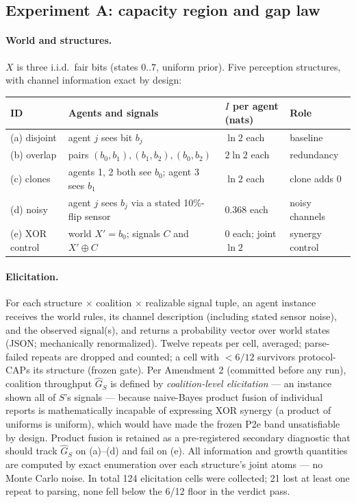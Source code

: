 \documentclass{article} %
\newcommand{\Ghat}{\hat{G}}
\begin{document}
\subsection{Experiment A: capacity region and gap law}
\label{sec:design-a}

\paragraph{World and structures.} $X$ is three i.i.d.\ fair bits (states $0..7$, uniform prior). Five perception structures, with channel information exact by design:

\begin{center}
\small
\begin{tabular}{@{}llll@{}}
\toprule
ID & Agents and signals & $I$ per agent (nats) & Role \\
\midrule
(a) disjoint & agent $j$ sees bit $b_j$ & $\ln 2$ each & baseline \\
(b) overlap & pairs $(b_0,b_1), (b_1,b_2), (b_0,b_2)$ & $2\ln 2$ each & redundancy \\
(c) clones & agents 1, 2 both see $b_0$; agent 3 sees $b_1$ & $\ln 2$ each & clone adds 0 \\
(d) noisy & agent $j$ sees $b_j$ via a stated 10\%-flip sensor & $0.368$ each & noisy channels \\
(e) XOR control & world $X' = b_0$; signals $C$ and $X' \oplus C$ & $0$ each; joint $\ln 2$ & synergy control \\
\bottomrule
\end{tabular}
\end{center}

\paragraph{Elicitation.} For each structure $\times$ coalition $\times$ realizable signal tuple, an agent instance receives the world rules, its channel description (including stated sensor noise), and the observed signal(s), and returns a probability vector over world states (JSON; mechanically renormalized). Twelve repeats per cell, averaged; parse-failed repeats are dropped and counted; a cell with $< 6/12$ survivors protocol-CAPs its structure (frozen gate). Per Amendment 2 (committed before any run), coalition throughput $\Ghat_S$ is defined by \emph{coalition-level elicitation} --- an instance shown all of $S$'s signals --- because naive-Bayes product fusion of individual reports is mathematically incapable of expressing XOR synergy (a product of uniforms is uniform), which would have made the frozen P2e band unsatisfiable by design. Product fusion is retained as a pre-registered secondary diagnostic that should track $\Ghat_S$ on (a)--(d) and fail on (e). All information and growth quantities are computed by exact enumeration over each structure's joint atoms --- no Monte Carlo noise. In total 124 elicitation cells were collected; 21 lost at least one repeat to parsing, none fell below the 6/12 floor in the verdict pass.
\end{document}
